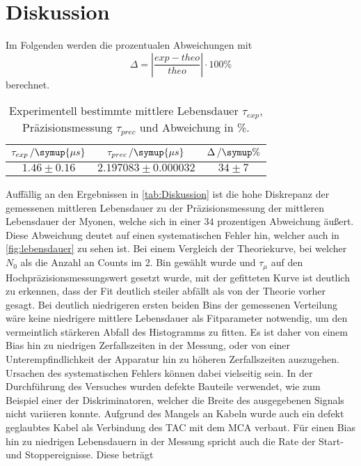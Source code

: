\section{Diskussion}
\label{sec:Diskussion}
Im Folgenden werden die prozentualen Abweichungen mit 
\begin{equation}\label{eq:1}
    \Delta = |\frac{exp - theo}{theo}|\cdot 100\%
\end{equation}
berechnet.

\begin{table}[H]
    \centering
    \caption{Experimentell bestimmte mittlere Lebensdauer $\tau_{exp}$, Präzisionsmessung $\tau_{prec}$ und Abweichung in \%.}
    \begin{tabular}{c c c}
        \toprule
        {$\tau_{exp}\,/\symup{\mu s}$} & {$\tau_{prec}\,/\symup{\mu s}$ \cite{pdg}} & {$\Delta\,/\symup{\%}$}\\
        \midrule
        $1.46 \pm 0.16$ & $2.197083 \pm 0.000032$ & $34 \pm 7$ \\
        \bottomrule
    \end{tabular}
    \label{tab:Diskussion}
\end{table}
Auffällig an den Ergebnissen in \autoref{tab:Diskussion} ist die hohe Diskrepanz der gemessenen mittleren Lebensdauer zu der Präzisionsmessung der mittleren Lebensdauer der Myonen, welche sich in einer $34$ prozentigen Abweichung äußert.
Diese Abweichung deutet auf einen systematischen Fehler hin, welcher auch in \autoref{fig:lebensdauer} zu sehen ist. Bei einem Vergleich der Theoriekurve, bei welcher $N_0$ als die Anzahl an Counts im 2. Bin gewählt wurde und $\tau_\mu$ auf den Hochpräzisionsmessungswert gesetzt wurde, mit der gefitteten Kurve ist deutlich zu erkennen, dass der Fit deutlich steiler abfällt als von der Theorie vorher gesagt.
Bei deutlich niedrigeren ersten beiden Bins der gemessenen Verteilung wäre keine niedrigere mittlere Lebensdauer als Fitparameter notwendig, um den vermeintlich stärkeren Abfall des Histogramms zu fitten. Es ist daher von einem Bias hin zu niedrigen Zerfallszeiten in der Messung, oder von einer Unterempfindlichkeit der Apparatur hin zu höheren Zerfallszeiten auszugehen. Ursachen des systematischen Fehlers können dabei vielseitig sein. In der Durchführung des Versuches wurden defekte Bauteile verwendet, wie zum Beispiel einer der Diskriminatoren, welcher die Breite des ausgegebenen Signals nicht variieren konnte. Aufgrund des Mangels an Kabeln wurde auch ein defekt geglaubtes Kabel als Verbindung des TAC mit dem MCA verbaut.
Für einen Bias hin zu niedrigen Lebensdauern in der Messung spricht auch die Rate der Start- und Stoppereignisse. Diese beträgt
